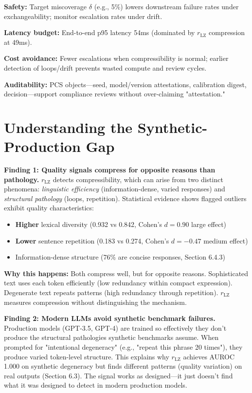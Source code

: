 \documentclass[11pt]{article}
\begin{document}
\textbf{Safety:} Target miscoverage $\delta$ (e.g., 5\%) lowers downstream failure rates under exchangeability; monitor escalation rates under drift.

\textbf{Latency budget:} End-to-end p95 latency 54ms (dominated by $r_{\text{LZ}}$ compression at 49ms).

\textbf{Cost avoidance:} Fewer escalations when compressibility is normal; earlier detection of loops/drift prevents wasted compute and review cycles.

\textbf{Auditability:} PCS objects---seed, model/version attestations, calibration digest, decision---support compliance reviews without over-claiming "attestation."

\section{Understanding the Synthetic-Production Gap}
\label{sec:limitations}

\textbf{Finding 1: Quality signals compress for opposite reasons than pathology.} $r_{\text{LZ}}$ detects compressibility, which can arise from two distinct phenomena: \textit{linguistic efficiency} (information-dense, varied responses) and \textit{structural pathology} (loops, repetition). Statistical evidence shows flagged outliers exhibit quality characteristics:
\begin{itemize}
\item \textbf{Higher} lexical diversity (0.932 vs 0.842, Cohen's $d=0.90$ large effect)
\item \textbf{Lower} sentence repetition (0.183 vs 0.274, Cohen's $d=-0.47$ medium effect)
\item Information-dense structure (76\% are concise responses, Section 6.4.3)
\end{itemize}

\textbf{Why this happens:} Both compress well, but for opposite reasons. Sophisticated text uses each token efficiently (low redundancy within compact expression). Degenerate text repeats patterns (high redundancy through repetition). $r_{\text{LZ}}$ measures compression without distinguishing the mechanism.

\textbf{Finding 2: Modern LLMs avoid synthetic benchmark failures.} Production models (GPT-3.5, GPT-4) are trained so effectively they don't produce the structural pathologies synthetic benchmarks assume. When prompted for "intentional degeneracy" (e.g., "repeat this phrase 20 times"), they produce varied token-level structure. This explains why $r_{\text{LZ}}$ achieves AUROC 1.000 on synthetic degeneracy but finds different patterns (quality variation) on real outputs (Section 6.3). The signal works as designed---it just doesn't find what it was designed to detect in modern production models.
\end{document}
